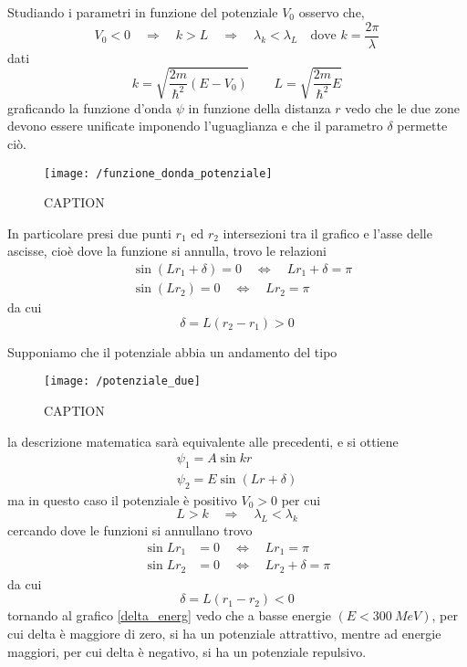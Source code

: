 Studiando i parametri in funzione del potenziale $V_0$ osservo che, 
\begin{equation}
V_0 < 0 
\quad\Rightarrow\quad 
k > L \quad\Rightarrow\quad 
\lambda_k < \lambda_L \quad \mbox{dove } k = \frac{2\pi}{\lambda}
\end{equation}
dati
\begin{equation}
k = \sqrt{\frac{2m}{\hbar^2}(E-V_0)} \quad\quad L = \sqrt{\frac{2m}{\hbar^2}E}
\end{equation}
graficando la funzione d'onda $\psi$ in funzione della distanza $r$ vedo che le due zone devono essere unificate imponendo l'uguaglianza e che il parametro $\delta$ permette ciò.
\begin{figure}[h]
\centering
\texttt{[image: /funzione\_donda\_potenziale]}
\caption{CAPTION}
\end{figure}
In particolare presi due punti $r_1$ ed $r_2$ intersezioni tra il grafico e l'asse delle ascisse, cioè dove la funzione si annulla, trovo le relazioni
\begin{equation}
\begin{split}
 & \sin (L r_1 + \delta) = 0 \quad\Leftrightarrow\quad L r_1 + \delta = \pi \\
 & \sin (L r_2) = 0 \quad\Leftrightarrow\quad L r_2 = \pi
\end{split}
\end{equation}
da cui
\begin{equation}
\delta = L (r_2 - r_1) > 0
\end{equation}

Supponiamo che il potenziale abbia un andamento del tipo 
\begin{figure}[h]
\centering
\texttt{[image: /potenziale\_due]}
\caption{CAPTION}
\end{figure}
la descrizione matematica sarà equivalente alle precedenti, e si ottiene
\begin{equation}
\begin{split}
\psi_1 = A \sin k r \\
\psi_2 = E \sin (Lr + \delta)
\end{split}
\end{equation}
ma in questo caso il potenziale è positivo $V_0 > 0$ per cui
\begin{equation}
L > k \quad\Rightarrow\quad \lambda_L < \lambda_k
\end{equation}
cercando dove le funzioni si annullano trovo
\begin{equation}
\begin{split}
\sin L r_1 & = 0 \quad\Leftrightarrow\quad L r_1 = \pi \\
\sin L r_2 & = 0 \quad\Leftrightarrow\quad L r_2 + \delta = \pi 
\end{split}
\end{equation}
da cui
\begin{equation}
\delta = L (r_1 - r_2) < 0
\end{equation}
tornando al grafico \ref{delta_energ} vedo che a basse energie $(E< \SI{300}{MeV})$, per cui delta è maggiore di zero, si ha un potenziale attrattivo, mentre ad energie maggiori, per cui delta è negativo, si ha un potenziale repulsivo.

